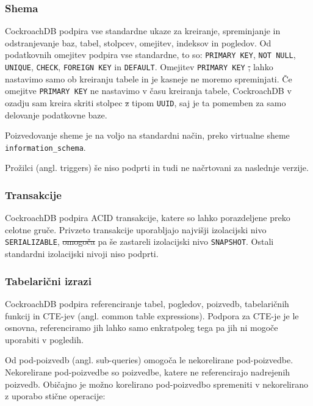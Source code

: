 \documentclass[a4paper, 12pt]{book}
\providecommand{\DIFaddtex}[1]{{\protect\color{blue}\uwave{#1}}} %
\providecommand{\DIFdeltex}[1]{{\protect\color{red}\sout{#1}}}                      %
\providecommand{\DIFaddbegin}{} %
\providecommand{\DIFaddend}{} %
\providecommand{\DIFdelbegin}{} %
\providecommand{\DIFdelend}{} %
\providecommand{\DIFadd}[1]{\texorpdfstring{\DIFaddtex{#1}}{#1}} %
\providecommand{\DIFdel}[1]{\texorpdfstring{\DIFdeltex{#1}}{}} %
\newcommand{\DIFscaledelfig}{0.5}
\newlength{\DIFdelgraphicswidth} %
\newlength{\DIFdelgraphicsheight} %
\newcommand{\DIFaddincludegraphics}[2][]{{\color{blue}\fbox{\DIFOincludegraphics[#1]{#2}}}} %
\newcommand{\DIFdelincludegraphics}[2][]{%
\sbox{\DIFdelgraphicsbox}{\DIFOincludegraphics[#1]{#2}}%
\settoboxwidth{\DIFdelgraphicswidth}{\DIFdelgraphicsbox} %
\settoboxtotalheight{\DIFdelgraphicsheight}{\DIFdelgraphicsbox} %
\scalebox{\DIFscaledelfig}{%
\parbox[b]{\DIFdelgraphicswidth}{\usebox{\DIFdelgraphicsbox}\\[-\baselineskip] \rule{\DIFdelgraphicswidth}{0em}}\llap{\resizebox{\DIFdelgraphicswidth}{\DIFdelgraphicsheight}{%
\setlength{\unitlength}{\DIFdelgraphicswidth}%
\begin{picture}(1,1)%
\thicklines\linethickness{2pt} %
{\color[rgb]{1,0,0}\put(0,0){\framebox(1,1){}}}%
{\color[rgb]{1,0,0}\put(0,0){\line( 1,1){1}}}%
{\color[rgb]{1,0,0}\put(0,1){\line(1,-1){1}}}%
\end{picture}%
}\hspace*{3pt}}} %
} %
\DeclareRobustCommand{\DIFaddbegin}{\DIFOaddbegin \let\includegraphics\DIFaddincludegraphics} %
\DeclareRobustCommand{\DIFaddend}{\DIFOaddend \let\includegraphics\DIFOincludegraphics} %
\DeclareRobustCommand{\DIFdelbegin}{\DIFOdelbegin \let\includegraphics\DIFdelincludegraphics} %
\DeclareRobustCommand{\DIFdelend}{\DIFOaddend \let\includegraphics\DIFOincludegraphics} %
\begin{document}
\newpage
\subsubsection{Shema}
CockroachDB podpira vse standardne ukaze za kreiranje, spreminjanje in odstranjevanje baz, tabel, stolpcev, omejitev, indeksov in pogledov. Od podatkovnih omejitev podpira vse standardne, to so: \texttt{PRIMARY KEY}, \texttt{NOT NULL}, \texttt{UNIQUE}, \texttt{CHECK}, \texttt{FOREIGN KEY} in \texttt{DEFAULT}. Omejitev \texttt{PRIMARY KEY} \DIFdelbegin \DIFdel{, }\DIFdelend lahko nastavimo samo ob kreiranju tabele in je kasneje ne moremo spreminjati. Če omejitve \texttt{PRIMARY KEY} ne nastavimo v času kreiranja tabele, CockroachDB v ozadju sam kreira skriti stolpec \DIFdelbegin \DIFdel{z }\DIFdelend \DIFaddbegin \DIFadd{s }\DIFaddend tipom \texttt{UUID}, saj je ta pomemben za samo delovanje podatkovne baze.

Poizvedovanje sheme je na voljo na standardni način, preko virtualne sheme \texttt{information\_schema}.

Prožilci (angl. triggers) še niso podprti in tudi ne načrtovani za naslednje verzije.

\subsubsection{Transakcije}
CockroachDB podpira ACID transakcije, katere so lahko porazdeljene preko celotne gruče. Privzeto transakcije uporabljajo najvišji izolacijski nivo \texttt{SERI\-ALIZABLE}, \DIFdelbegin \DIFdel{omogoča }\DIFdelend \DIFaddbegin \DIFadd{omogočajo }\DIFaddend pa še zastareli izolacijski nivo \texttt{SNAPSHOT}. Ostali standardni izolacijski nivoji niso podprti.

\subsubsection{Tabelarični izrazi}
CockroachDB podpira referenciranje tabel, pogledov, poizvedb, tabelaričnih funkcij in CTE-jev (angl. common table expressions). Podpora za CTE-je je le osnovna, referenciramo jih lahko samo enkrat\DIFaddbegin \DIFadd{, }\DIFaddend poleg tega pa jih ni mogoče uporabiti v pogledih.

Od pod-poizvedb (angl. sub-queries) omogoča le nekorelirane pod-poiz\-vedbe. Nekorelirane pod-poizvedbe so poizvedbe, katere ne referencirajo nadrejenih poizvedb. Običajno je možno korelirano pod-poizvedbo spremeniti v nekorelirano z uporabo stične operacije:
\end{document}
